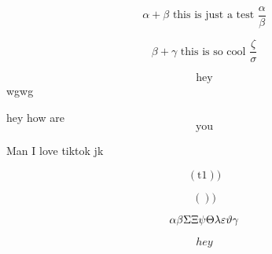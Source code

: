 \begin{equation}
  \alpha + \beta \text{ this is just a test } \frac{\alpha}{\beta}
\end{equation}

\begin{equation*}
  \beta + \gamma \text{ this is so cool } \frac{\zeta}{\sigma}
\end{equation*} 

\[\text{hey}\]
wgwg

hey how are \[\text{you}\]

Man I love tiktok jk 

\begin{equation}
 \left(\text{t1}\right))
\end{equation}

\begin{equation}
 \left(\right))
\end{equation}


\begin{equation}
  \alpha \\
  \beta \\
  \Sigma \\
  \Xi \\
  \psi \\
  \Theta \\
  \lambda \\
  \varepsilon \\
  \vartheta \\
  \gamma
\end{equation}

\[hey\]

